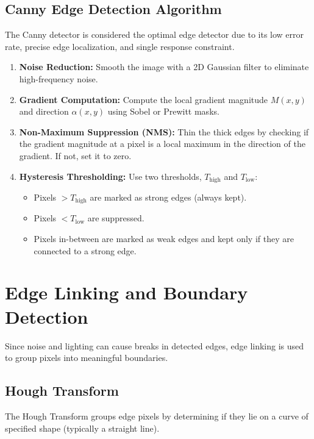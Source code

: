 \documentclass[12pt,a4paper]{article}
\begin{document}
\subsection{Canny Edge Detection Algorithm}
The Canny detector is considered the optimal edge detector due to its low error rate, precise edge localization, and single response constraint.
\begin{enumerate}[leftmargin=*, itemsep=3.5pt]
  \item \textbf{Noise Reduction:} Smooth the image with a 2D Gaussian filter to eliminate high-frequency noise.
  \item \textbf{Gradient Computation:} Compute the local gradient magnitude $M(x,y)$ and direction $\alpha(x,y)$ using Sobel or Prewitt masks.
  \item \textbf{Non-Maximum Suppression (NMS):} Thin the thick edges by checking if the gradient magnitude at a pixel is a local maximum in the direction of the gradient. If not, set it to zero.
  \item \textbf{Hysteresis Thresholding:} Use two thresholds, $T_{\text{high}}$ and $T_{\text{low}}$:
    \begin{itemize}[leftmargin=1em, itemsep=1pt]
      \item Pixels $> T_{\text{high}}$ are marked as strong edges (always kept).
      \item Pixels $< T_{\text{low}}$ are suppressed.
      \item Pixels in-between are marked as weak edges and kept only if they are connected to a strong edge.
    \end{itemize}
\end{enumerate}

\section{Edge Linking and Boundary Detection}

Since noise and lighting can cause breaks in detected edges, edge linking is used to group pixels into meaningful boundaries.

\subsection{Hough Transform}
The Hough Transform groups edge pixels by determining if they lie on a curve of specified shape (typically a straight line).
\end{document}
